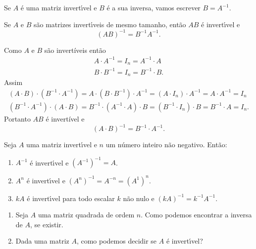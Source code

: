 \begin{notacao}
    Se $A$ \'e uma matriz invert{\'\i}vel e $B$ \'e a sua inversa, vamos escrever $B = A^{-1}$.
\end{notacao}

\begin{proposicao}
    Se $A$ e $B$ s\~ao matrizes invert{\'\i}veis de mesmo tamanho, ent\~ao $AB$ \'e invert{\'\i}vel e
    \[
        (AB)^{-1} = B^{-1} A^{-1}.
    \]
\end{proposicao}
\begin{prova}
    Como $A$ e $B$ são invertíveis então
    \begin{align*}
        A\cdot A^{-1} = I_n = A^{-1}\cdot A\\
        B\cdot B^{-1} = I_n = B^{-1}\cdot B.
    \end{align*}
    Assim
    \begin{align*}
        (A\cdot B)\cdot (B^{-1}\cdot A^{-1}) = A \cdot (B \cdot B^{-1})\cdot A^{-1} = (A \cdot I_n) \cdot A^{-1} = A\cdot A^{-1} = I_n\\
        (B^{-1}\cdot A^{-1}) \cdot (A\cdot B) = B^{-1}\cdot (A^{-1} \cdot A)\cdot B = (B^{-1} \cdot I_n) \cdot B = B^{-1}\cdot A = I_n.
    \end{align*}
    Portanto $AB$ é invertível e
    \[
        (A\cdot B)^{-1} = B^{-1}\cdot A^{-1}.
    \]
\end{prova}

\begin{proposicao}
    Seja $A$ uma matriz invert{\'\i}vel e $n$ um n\'umero inteiro n\~ao negativo. Ent\~ao:
    \begin{enumerate}[label={\roman*})]
        \item $A^{-1}$ \'e invert{\'\i}vel e $(A^{-1})^{-1} = A$.

        \item $A^n$ \'e invert{\'\i}vel e $(A^n)^{-1} = A^{-n} = (A^{1})^n$.

        \item $kA$ \'e invert{\'\i}vel para todo escalar $k$ n\~ao nulo e $(kA)^{-1} = k^{-1}A^{-1}$.
    \end{enumerate}
\end{proposicao}

\begin{enumerate}[label={\arabic*})]
    \item Seja $A$ uma matriz quadrada de ordem $n$. Como podemos encontrar a inversa de $A$, se existir.

    \item Dada uma matriz $A$, como podemos decidir se $A$ \'e invert{\'\i}vel?
\end{enumerate}

